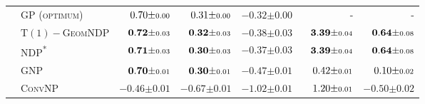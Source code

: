\begin{table}[b]
\begin{tabular}{llrrrrr}
		\midrule
		\parbox[t]{2mm}{}
		 & \scshape GP (optimum)                                   & \(\hphantom{-}0.70 { \pm \scriptstyle 0.00 }\)                                  & \(\hphantom{-}0.31 { \pm \scriptstyle 0.00 }\)                                  & \(-0.32 { \pm \scriptstyle 0.00 }\)                                  & -                                                                             & -                                                                             \\
		 & \scshape \(\mathrm{T}(1)-\)GeomNDP &  \(\hphantom{-}\mathbf{0.72} { \pm \scriptstyle 0.03 }\) &  \(\hphantom{-}\mathbf{0.32} { \pm \scriptstyle 0.03 }\) &  \(\mathbf{-0.38} { \pm \scriptstyle 0.03 }\) &  \(\hphantom{-}\mathbf{3.39} { \pm \scriptstyle 0.04 }\) &  \(\hphantom{-}\mathbf{0.64} { \pm \scriptstyle 0.08 }\) \\
		 & \scshape NDP\textsuperscript{*}                         & \(\hphantom{-}\mathbf{0.71} { \pm \scriptstyle 0.03 }\)                         & \(\hphantom{-}\mathbf{0.30} { \pm \scriptstyle 0.03 }\)                         & \(\mathbf{-0.37} { \pm \scriptstyle 0.03 }\)                         & \(\hphantom{-}\mathbf{3.39} { \pm \scriptstyle 0.04 }\)                         & \(\hphantom{-}\mathbf{0.64} { \pm \scriptstyle 0.08 }\)                         \\
		 & \scshape GNP                                            & \(\hphantom{-}\mathbf{0.70} { \pm \scriptstyle 0.01 }\)                         & \(\hphantom{-}\mathbf{0.30} { \pm \scriptstyle 0.01 }\)                         & \(-0.47 { \pm \scriptstyle 0.01 }\)                                  & \(\hphantom{-}0.42 { \pm \scriptstyle 0.01 }\)                                  & \(\hphantom{-}0.10 { \pm \scriptstyle 0.02 }\)                                  \\
		 & \scshape ConvNP                                         & \(-0.46 { \pm \scriptstyle 0.01 }\)                                             & \(-0.67 { \pm \scriptstyle 0.01 }\)                                             & \(-1.02 { \pm \scriptstyle 0.01 }\)                                  & \(\hphantom{-}1.20 { \pm \scriptstyle 0.01 }\)                                  & \(-0.50 { \pm \scriptstyle 0.02 }\)                                             \\


\end{tabular}
\end{table}

